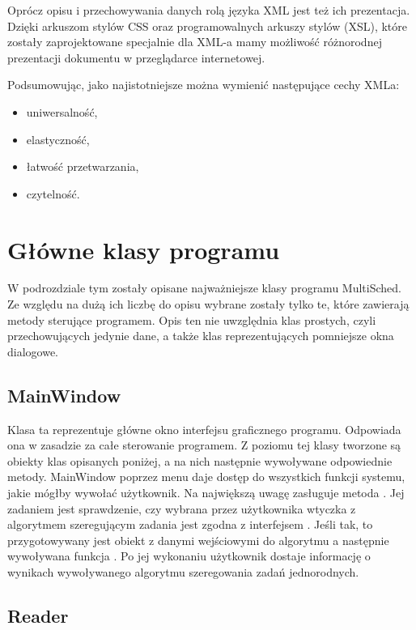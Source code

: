 Oprócz opisu i przechowywania danych rolą języka XML jest też ich prezentacja. Dzięki arkuszom stylów CSS oraz programowalnych arkuszy 
stylów (XSL), które zostały zaprojektowane specjalnie dla XML-a mamy możliwość różnorodnej prezentacji dokumentu w przeglądarce internetowej. 

Podsumowując, jako najistotniejsze można wymienić następujące cechy XMLa:
\begin{itemize}
	\item uniwersalność,
	\item elastyczność,
	\item łatwość przetwarzania,
	\item czytelność.
\end{itemize}

\section{Główne klasy programu}

W podrozdziale tym zostały opisane najważniejsze klasy programu MultiSched. Ze względu na dużą ich liczbę do opisu wybrane zostały tylko te, 
które zawierają metody sterujące programem. Opis ten nie uwzględnia klas prostych, czyli przechowujących jedynie dane, a także klas 
reprezentujących pomniejsze okna dialogowe.

\subsection{MainWindow}

Klasa ta reprezentuje główne okno interfejsu graficznego programu. Odpowiada ona w zasadzie za całe sterowanie programem. Z poziomu tej 
klasy tworzone są obiekty klas opisanych poniżej, a na nich następnie wywoływane odpowiednie metody. MainWindow poprzez menu daje dostęp do wszystkich funkcji 
systemu, jakie mógłby wywołać użytkownik. Na największą uwagę zasługuje metoda . Jej zadaniem jest sprawdzenie, czy wybrana przez 
użytkownika wtyczka z algorytmem szeregującym zadania jest zgodna z interfejsem . Jeśli tak, to przygotowywany jest obiekt 
z danymi wejściowymi do algorytmu a następnie wywoływana funkcja . 
Po jej wykonaniu użytkownik dostaje informację o wynikach wywoływanego algorytmu szeregowania zadań jednorodnych.

\subsection{Reader}

